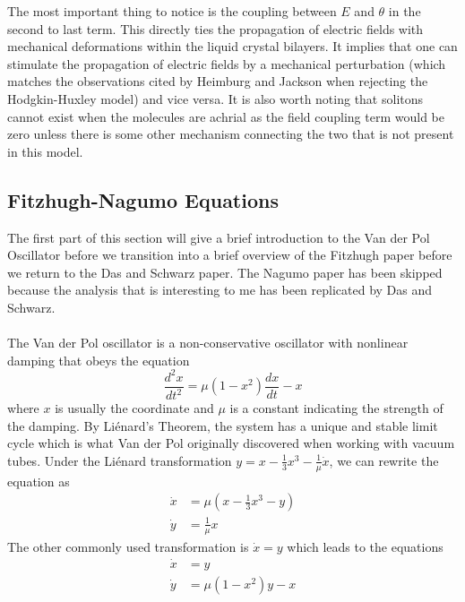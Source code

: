 \documentclass{article}
\newcommand{\od}[2]{\frac{d #1}{d #2}}
\newcommand{\odt}[2]{\frac{d^2 #1}{d #2 ^2}}
\numberwithin{equation}{section}
\begin{document}
The most important thing to notice is the coupling between $E$ and $\theta$ in the second to last term. This directly ties the propagation of electric fields with mechanical deformations within the liquid crystal bilayers. It implies that one can stimulate the propagation of electric fields by a mechanical perturbation (which matches the observations cited by Heimburg and Jackson when rejecting the Hodgkin-Huxley model) and vice versa. It is also worth noting that solitons cannot exist when the molecules are achrial as the field coupling term would be zero unless there is some other mechanism connecting the two that is not present in this model. 
\subsection{Fitzhugh-Nagumo Equations}
The first part of this section will give a brief introduction to the Van der Pol Oscillator before we transition into a brief overview of the Fitzhugh paper before we return to the Das and Schwarz paper. The Nagumo paper has been skipped because the analysis that is interesting to me has been replicated by Das and Schwarz. \\\\
The Van der Pol oscillator is a non-conservative oscillator with nonlinear damping that obeys the equation 
\begin{equation}
    \odt{x}{t} = \mu(1-x^2) \od{x}{t} -x
\end{equation}
where $x$ is usually the coordinate and $\mu$ is a constant indicating the strength of the damping. By Li\'{e}nard's Theorem, the system has a unique and stable limit cycle which is what Van der Pol originally discovered when working with vacuum tubes. Under the Li\'{e}nard transformation $y=x-\tfrac{1}{3}x^3 - \tfrac{1}{\mu}\dot{x}$, we can rewrite the equation as 
\begin{equation}
\begin{split}
    \dot{x} &= \mu(x-\frac{1}{3}x^3-y) \\
    \dot{y} &= \frac{1}{\mu}x
\end{split}
\end{equation}
The other commonly used transformation is $\dot{x} = y$ which leads to the equations 
\begin{equation}
\begin{split}
    \dot{x}& = y\\
    \dot{y} &= \mu(1-x^2)y-x
\end{split}
\end{equation}
\end{document}
